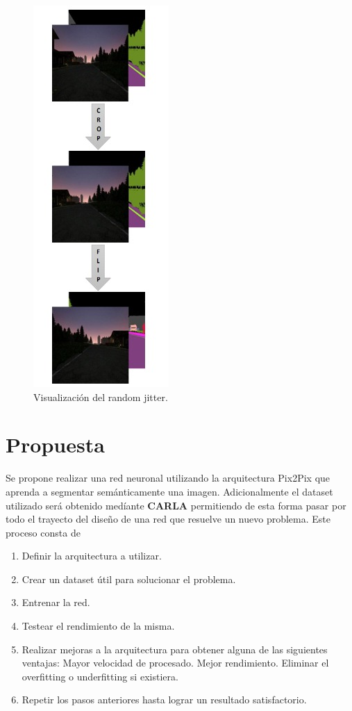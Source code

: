 \documentclass[]{IEEEtran}
\begin{document}
    \begin{figure}
        \centering
        \includegraphics[width=.25\textwidth]{Imgs/random_jitter.jpeg}
        \caption{Visualización del random jitter.}
        \label{fig:crop-flip}
    \end{figure}

    \section{Propuesta}

    Se propone realizar una red neuronal utilizando la arquitectura Pix2Pix que 
    aprenda a segmentar semánticamente una imagen. Adicionalmente el 
    dataset utilizado será obtenido medíante \textbf{CARLA} permitiendo de esta forma 
    pasar por todo el trayecto del diseño de una red que resuelve un nuevo problema. 
    Este proceso consta de 

    \begin{enumerate}
        \item Definir la arquitectura a utilizar.
        \item Crear un dataset útil para solucionar el problema.
        \item Entrenar la red.
        \item Testear el rendimiento de la misma.
        \item Realizar mejoras a la arquitectura para obtener alguna de las siguientes ventajas: 
            \subitem Mayor velocidad de procesado.
            \subitem Mejor rendimiento. 
            \subitem Eliminar el overfitting o underfitting si existiera.
        \item Repetir los pasos anteriores hasta lograr un resultado satisfactorio.
    \end{enumerate}
\end{document}
